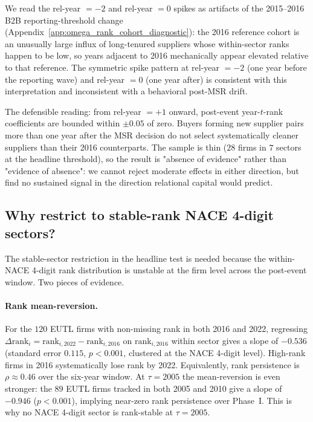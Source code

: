 We read the rel-year $= -2$ and rel-year $= 0$ spikes as artifacts of the 2015--2016 B2B reporting-threshold change (Appendix~\ref{app:omega_rank_cohort_diagnostic}): the 2016 reference cohort is an unusually large influx of long-tenured suppliers whose within-sector ranks happen to be low, so years adjacent to 2016 mechanically appear elevated relative to that reference. The symmetric spike pattern at rel-year $= -2$ (one year before the reporting wave) and rel-year $= 0$ (one year after) is consistent with this interpretation and inconsistent with a behavioral post-MSR drift.

The defensible reading: from rel-year $= +1$ onward, post-event year-$t$-rank coefficients are bounded within $\pm 0.05$ of zero. Buyers forming new supplier pairs more than one year after the MSR decision do not select systematically cleaner suppliers than their 2016 counterparts. The sample is thin ($28$ firms in $7$ sectors at the headline threshold), so the result is "absence of evidence" rather than "evidence of absence": we cannot reject moderate effects in either direction, but find no sustained signal in the direction relational capital would predict.

\subsection{Why restrict to stable-rank NACE 4-digit sectors?}\label{app:omega_rank_rank_instability}

The stable-sector restriction in the headline test is needed because the within-NACE 4-digit rank distribution is unstable at the firm level across the post-event window. Two pieces of evidence.

\paragraph{Rank mean-reversion.} For the $120$ EUTL firms with non-missing rank in both 2016 and 2022, regressing $\Delta \text{rank}_i = \text{rank}_{i, 2022} - \text{rank}_{i, 2016}$ on $\text{rank}_{i, 2016}$ within sector gives a slope of $-0.536$ (standard error $0.115$, $p < 0.001$, clustered at the NACE 4-digit level). High-rank firms in 2016 systematically lose rank by 2022. Equivalently, rank persistence is $\rho \approx 0.46$ over the six-year window. At $\tau = 2005$ the mean-reversion is even stronger: the $89$ EUTL firms tracked in both 2005 and 2010 give a slope of $-0.946$ ($p < 0.001$), implying near-zero rank persistence over Phase~I. This is why no NACE 4-digit sector is rank-stable at $\tau = 2005$.

